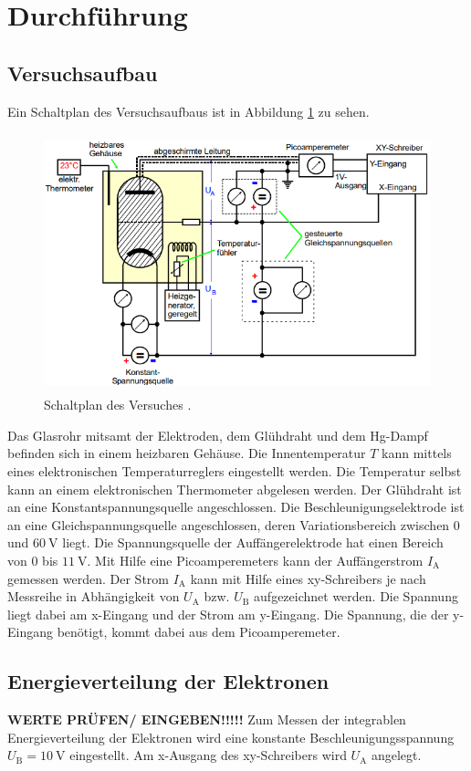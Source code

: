 \section{Durchführung}

\subsection{Versuchsaufbau}
Ein Schaltplan des Versuchsaufbaus ist in Abbildung \ref{fig:schaltung} zu sehen.
\begin{figure}[H]
    \centering
    \includegraphics[height = 7.5cm]{bilder/schaltung.png}
    \caption{Schaltplan des Versuches \cite{man:v601}.}
    \label{fig:schaltung}
\end{figure}

\noindent
Das Glasrohr mitsamt der Elektroden, dem Glühdraht und dem Hg-Dampf befinden sich in einem heizbaren Gehäuse.
Die Innentemperatur $T$ kann mittels eines elektronischen Temperaturreglers eingestellt werden.
Die Temperatur selbst kann an einem elektronischen Thermometer abgelesen werden.
Der Glühdraht ist an eine Konstantspannungsquelle angeschlossen.
Die Beschleunigungselektrode ist an eine Gleichspannungsquelle angeschlossen, deren Variationsbereich zwischen 0 und $\qty{60}{\volt}$ liegt.
Die Spannungsquelle der Auffängerelektrode hat einen Bereich von 0 bis $\qty{11}{\volt}$.
Mit Hilfe eine Picoamperemeters kann der Auffängerstrom $I_\text{A}$ gemessen werden.
Der Strom $I_\text{A}$ kann mit Hilfe eines xy-Schreibers je nach Messreihe in Abhängigkeit von $U_\text{A}$ bzw. $U_\text{B}$ aufgezeichnet werden.
Die Spannung liegt dabei am x-Eingang und der Strom am y-Eingang.
Die Spannung, die der y-Eingang benötigt, kommt dabei aus dem Picoamperemeter.


\subsection{Energieverteilung der Elektronen}
\textbf{WERTE PRÜFEN/ EINGEBEN!!!!!}
Zum Messen der integrablen Energieverteilung der Elektronen wird eine konstante Beschleunigungsspannung $U_\text{B} = \qty[]{10}{\volt}$ eingestellt.
Am x-Ausgang des xy-Schreibers wird $U_\text{A}$ angelegt.